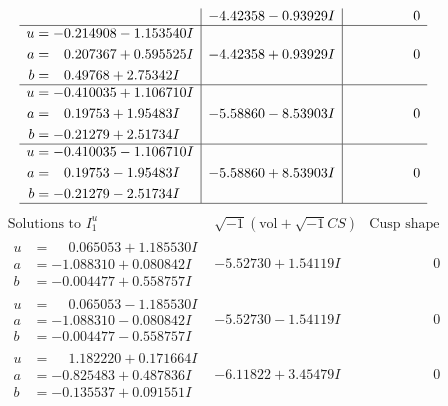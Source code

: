 \documentclass[1p]{elsarticle_modified}
\theoremstyle{definition}
\newcommand{\I}{\sqrt{-1}}
\begin{document}
$$\begin{array}{c|c|c}
 & -4.42358 - 0.93929 I & \phantom{-0.000000 } 0 \\ \hline\begin{aligned}
u &= -0.214908 - 1.153540 I \\
a &= \phantom{-}0.207367 + 0.595525 I \\
b &= \phantom{-}0.49768 + 2.75342 I\end{aligned}
 & -4.42358 + 0.93929 I & \phantom{-0.000000 } 0 \\ \hline\begin{aligned}
u &= -0.410035 + 1.106710 I \\
a &= \phantom{-}0.19753 + 1.95483 I \\
b &= -0.21279 + 2.51734 I\end{aligned}
 & -5.58860 - 8.53903 I & \phantom{-0.000000 } 0 \\ \hline\begin{aligned}
u &= -0.410035 - 1.106710 I \\
a &= \phantom{-}0.19753 - 1.95483 I \\
b &= -0.21279 - 2.51734 I\end{aligned}
 & -5.58860 + 8.53903 I & \phantom{-0.000000 } 0\\
 \hline 
 \end{array}$$\newpage$$\begin{array}{c|c|c}  
\text{Solutions to }I^u_{1}& \I (\text{vol} + \sqrt{-1}CS) & \text{Cusp shape}\\
 \hline 
\begin{aligned}
u &= \phantom{-}0.065053 + 1.185530 I \\
a &= -1.088310 + 0.080842 I \\
b &= -0.004477 + 0.558757 I\end{aligned}
 & -5.52730 + 1.54119 I & \phantom{-0.000000 } 0 \\ \hline\begin{aligned}
u &= \phantom{-}0.065053 - 1.185530 I \\
a &= -1.088310 - 0.080842 I \\
b &= -0.004477 - 0.558757 I\end{aligned}
 & -5.52730 - 1.54119 I & \phantom{-0.000000 } 0 \\ \hline\begin{aligned}
u &= \phantom{-}1.182220 + 0.171664 I \\
a &= -0.825483 + 0.487836 I \\
b &= -0.135537 + 0.091551 I\end{aligned}
 & -6.11822 + 3.45479 I & \phantom{-0.000000 } 0 \\ \hline\begin{aligned}

\end{aligned}
\end{array}$$
\end{document}
